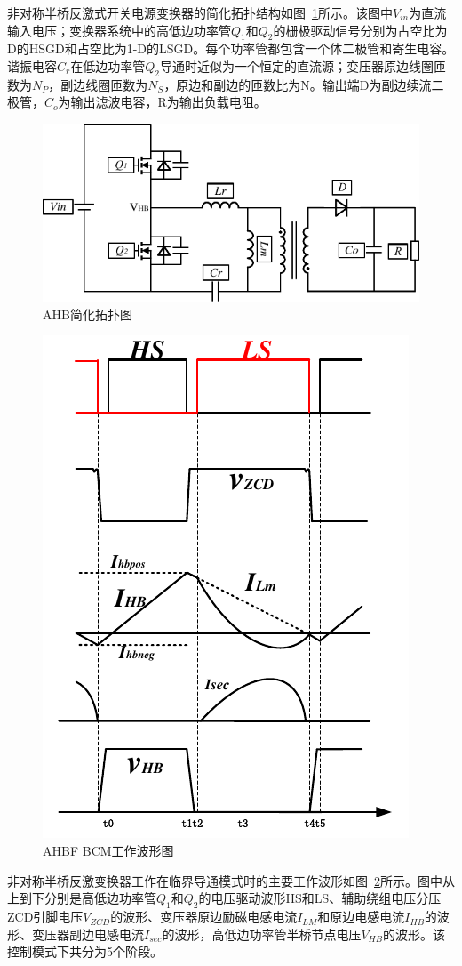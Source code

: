 非对称半桥反激式开关电源变换器的简化拓扑结构如图~\ref{fig:AHB简化拓扑图}所示。该图中$V_{in}$为直流输入电压；变换器系统中的高低边功率管$Q_1$和$Q_2$的栅极驱动信号分别为占空比为D的HSGD和占空比为1-D的LSGD。每个功率管都包含一个体二极管和寄生电容。谐振电容$C_r$在低边功率管$Q_2$导通时近似为一个恒定的直流源；变压器原边线圈匝数为$N_P$，副边线圈匝数为$N_S$，原边和副边的匝数比为N。输出端D为副边续流二极管，$C_o$为输出滤波电容，R为输出负载电阻。

\begin{figure}[htbp] 
    \centering
    \includegraphics[width=0.6\linewidth]{figures/AHB简化拓扑图.pdf}
    \caption{AHB简化拓扑图}
    \label{fig:AHB简化拓扑图}
\end{figure}

\begin{figure}[htbp] 
    \centering
    \includegraphics[width=0.6\linewidth]{figures/BCM工作波形图.pdf}
    \caption{AHBF BCM工作波形图}
    \label{fig:BCM工作波形图}
\end{figure}
								
非对称半桥反激变换器工作在临界导通模式时的主要工作波形如图~\ref{fig:BCM工作波形图}所示。图中从上到下分别是高低边功率管$Q_1$和$Q_2$的电压驱动波形HS和LS、辅助绕组电压分压ZCD引脚电压$V_{ZCD}$的波形、变压器原边励磁电感电流$I_{LM}$和原边电感电流$I_{HB}$的波形、变压器副边电感电流$I_{sec}$的波形，高低边功率管半桥节点电压$V_{HB}$的波形。该控制模式下共分为5个阶段。
						


